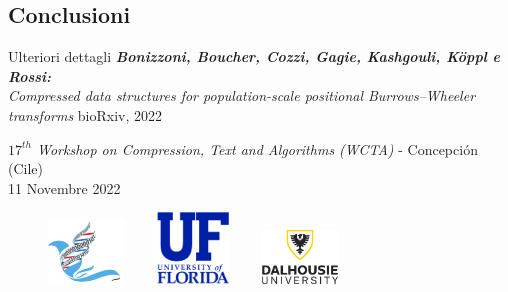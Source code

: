 \documentclass[]{beamer}
\begin{document}
\subsection{Conclusioni}
\begin{frame}{}
  \begin{block}{Ulteriori dettagli}
    \footnotesize{\textit{\textbf{Bonizzoni, Boucher, Cozzi, Gagie, Kashgouli,
          K\"{o}ppl e Rossi:} \\Compressed data structures for
          population-scale positional Burrows--Wheeler transforms}
      bioRxiv, 2022}
  \end{block}
  \begin{block}{}
    \footnotesize{\textit{$17^{\mathit{th}}$ Workshop on Compression, Text and
          Algorithms (WCTA)} - Concepción (Cile)\\11 Novembre 2022} 
  \end{block}
  \begin{figure}[H]
    \centering
    \includegraphics[width = 0.18\textwidth]{img/logo-bias.pdf}$\quad\quad$
    \includegraphics[width = 0.17\textwidth]{img/ufl.png}$\quad\quad$
    \includegraphics[width = 0.18\textwidth]{img/dal.png}$\quad\quad$

\end{figure}
\end{frame}
\end{document}
